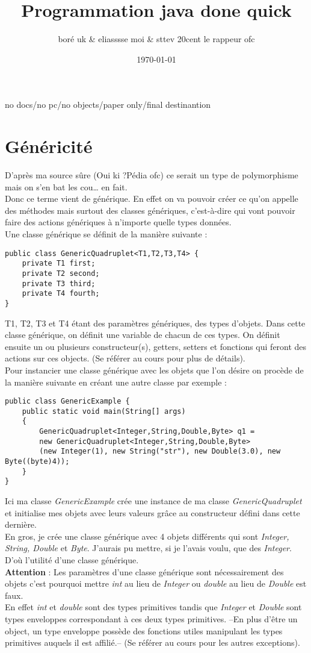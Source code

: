 \documentclass{article}
\title{Programmation java done quick}
\author{boré uk \& eliasssse moi  \& sttev 20cent le rappeur ofc}
\date{\today}
\begin{document}
\maketitle{}

no docs/no pc/no objects/paper only/final destinantion
\section{Généricité}
D'après ma source sûre (Oui ki ?Pédia ofc) ce serait un type de polymorphisme mais on s'en bat les cou… en fait.\\
Donc ce terme vient de générique. En effet on va pouvoir créer ce qu'on appelle des méthodes mais surtout des classes génériques, c'est-à-dire qui vont pouvoir faire des actions génériques à n'importe quelle types données.\\
Une classe générique se définit de la manière suivante :
\begin{lstlisting}
public class GenericQuadruplet<T1,T2,T3,T4> {
	private T1 first;
	private T2 second;
	private T3 third;
	private T4 fourth;
}
\end{lstlisting}
T1, T2, T3 et T4 étant des paramètres génériques, des types d'objets. Dans cette classe générique, on définit une variable de chacun de ces types. On définit ensuite un ou plusieurs constructeur(s), getters, setters et fonctions qui feront des actions sur ces objects. (Se référer au cours pour plus de détails).\\
Pour instancier une classe générique avec les objets que l'on désire on procède de la manière suivante en créant une autre classe par exemple :
\begin{lstlisting}
public class GenericExample {
	public static void main(String[] args)
	{
		GenericQuadruplet<Integer,String,Double,Byte> q1 =
		new GenericQuadruplet<Integer,String,Double,Byte>
		(new Integer(1), new String("str"), new Double(3.0), new Byte((byte)4));
	}
}
\end{lstlisting}
Ici ma classe \emph{GenericExample} crée une instance de ma classe \emph{GenericQuadruplet} et initialise mes objets avec leurs valeurs grâce au constructeur défini dans cette dernière.\\
En gros, je crée une classe générique avec 4 objets différents qui sont\emph{ Integer, String, Double} et \emph{Byte}. J'aurais pu mettre, si je l'avais voulu, que des \emph{Integer}. D'où l'utilité d'une classe générique.\\

\textbf{Attention} : Les paramètres d'une classe générique sont nécessairement des objets c'est pourquoi mettre \emph{int} au lieu de \emph{Integer} ou \emph{double} au lieu de \emph{Double} est faux.\\
En effet \emph{int} et \emph{double} sont des types primitives tandis que \emph{Integer} et \emph{Double} sont types enveloppes correspondant à ces deux types primitives. --En plus d'être un object, un type enveloppe possède des fonctions utiles manipulant les types primitives auquels il est affilié.-- (Se référer au cours pour les autres exceptions).\\
\end{document}
